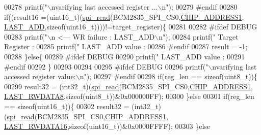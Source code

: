 \begin{DoxyCode}
{{{{{{{{{00278 \textcolor{preprocessor}{}       printf(\textcolor{stringliteral}{"\(\backslash\)nvarifying last accessed register  ...\(\backslash\)n"});
00279 \textcolor{preprocessor}{     #endif}
00280 \textcolor{preprocessor}{}     \textcolor{keywordflow}{if}((result16 =(uint16\_t)(\hyperlink{a00007_ga7ad9f65ee46aca507374096506a0b1c4}{spi\_read}(BCM2835\_SPI\_CS0,\hyperlink{a00037_a94de2b046db6e10257ef4481c0a15eaa}{CHIP\_ADDRESS1},
      \hyperlink{a00036_adab6c053c389db762442c88b7e32e543}{LAST\_ADD},\textcolor{keyword}{sizeof}(uint16\_t))))!=target\_register)\{
00281              
00282 \textcolor{preprocessor}{     #ifdef DEBUG}
00283 \textcolor{preprocessor}{}       printf(\textcolor{stringliteral}{"\(\backslash\)n                                               <---  WR failure : LAST\_ADD\(\backslash\)n"});
00284        printf(\textcolor{stringliteral}{"        Target Register :%
00285        printf(\textcolor{stringliteral}{"        LAST\_ADD value  :%
00286 \textcolor{preprocessor}{     #endif}
00287 \textcolor{preprocessor}{}     result = -1;
00288      \}\textcolor{keywordflow}{else}\{
00289 \textcolor{preprocessor}{      #ifdef DEBUG}
00290 \textcolor{preprocessor}{}        printf(\textcolor{stringliteral}{"       LAST\_ADD value  :%
00291 \textcolor{preprocessor}{      #endif}
00292 \textcolor{preprocessor}{}     \}
00293      
00294     
00295 \textcolor{preprocessor}{     #ifdef DEBUG}
00296 \textcolor{preprocessor}{}       printf(\textcolor{stringliteral}{"\(\backslash\)nvarifying last accessed register  value:\(\backslash\)n"});
00297 \textcolor{preprocessor}{     #endif}
00298 \textcolor{preprocessor}{}    \textcolor{keywordflow}{if}(reg\_len == \textcolor{keyword}{sizeof}(uint8\_t))\{
00299         result32 = (int32\_t)(\hyperlink{a00007_ga7ad9f65ee46aca507374096506a0b1c4}{spi\_read}(BCM2835\_SPI\_CS0,\hyperlink{a00037_a94de2b046db6e10257ef4481c0a15eaa}{CHIP\_ADDRESS1},
      \hyperlink{a00036_ac23cb2354e07d7403fca849805a8e278}{LAST\_RWDATA8},\textcolor{keyword}{sizeof}(uint8\_t))&0x000000FF);
00300     \}\textcolor{keywordflow}{else}   
00301     \textcolor{keywordflow}{if}(reg\_len == \textcolor{keyword}{sizeof}(uint16\_t))\{
00302         result32 = (int32\_t)(\hyperlink{a00007_ga7ad9f65ee46aca507374096506a0b1c4}{spi\_read}(BCM2835\_SPI\_CS0,\hyperlink{a00037_a94de2b046db6e10257ef4481c0a15eaa}{CHIP\_ADDRESS1},
      \hyperlink{a00036_afcefca411effe86930341732382fb5e5}{LAST\_RWDATA16},\textcolor{keyword}{sizeof}(uint16\_t))&0x0000FFFF);
00303     \}\textcolor{keywordflow}{else}
}}}}}}}}}}}}
\end{DoxyCode}
